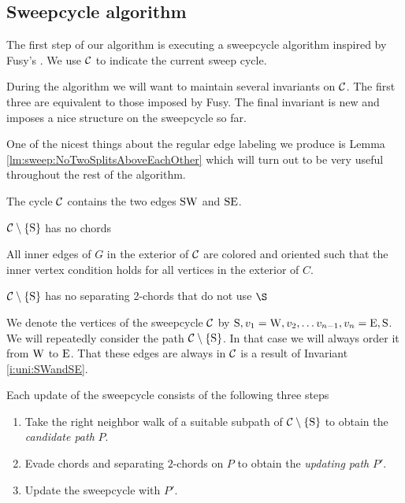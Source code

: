 
\subsection{Sweepcycle algorithm}
\thispagestyle{plain}
  \label{ss:sweep}
  The first step of our algorithm is executing a sweepcycle algorithm inspired by Fusy's \cite{Fusy2006}. We use $\mathcal{C}$ to indicate the current sweep cycle.

  During the algorithm we will want to maintain several invariants on $\mathcal{C}$. The first three are equivalent to those imposed by Fusy. The final invariant is new and imposes a nice structure on the sweepcycle so far.  

  One of the nicest things about the regular edge labeling we produce is Lemma \ref{lm:sweep:NoTwoSplitsAboveEachOther} which will turn out to be very useful throughout the rest of the algorithm. 

  \begin{invariants}
    \itemsep=-4pt

    \item \label{i:uni:SWandSE} The cycle $\mathcal{C}$ contains the two edges $\mathrm{S} \mathrm{W}$ and $\mathrm{S} \mathrm{E}$.
    \item \label{i:uni:noChords} $\mathcal{C} \setminus \left\lbrace {\mathrm{S}} \right\rbrace$ has no chords
    \item \label{i:uni:intVertCond} All inner edges of $G$ in the exterior of $\mathcal{C}$ are colored and oriented such that the inner vertex condition holds for all vertices in the exterior of $C$.
    \item \label{i:uni:no2Chords} $\mathcal{C}\setminus \left\lbrace {\mathrm{S}} \right\rbrace$ has no separating 2-chords that do not use $\S$
  \end{invariants}

  We denote the vertices of the sweepcycle $\mathcal{C}$ by $\mathrm{S}, v_1 = \mathrm{W}, v_2, \ldots v_{n-1}, v_n = \mathrm{E}, \mathrm{S}$.   We will repeatedly consider the path $\mathcal{C} \setminus \left\lbrace {\mathrm{S}} \right\rbrace$. In that case we will always order it from $\mathrm{W}$ to $\mathrm{E}$. That these edges are always in $\mathcal{C}$ is a result of Invariant \ref{i:uni:SWandSE}.


  Each update of the sweepcycle consists of the following three steps
  \begin{enumerate}
    \itemsep=-4pt
    \item Take the right neighbor walk of a suitable subpath of $\mathcal{C} \setminus \left\lbrace {\mathrm{S}} \right\rbrace$ to obtain the \emph{candidate path} $P$.
    \item Evade chords and separating $2$-chords on $P$ to obtain the \emph{updating path} $P'$.
    \item Update the sweepcycle with $P'$.
  \end{enumerate}

